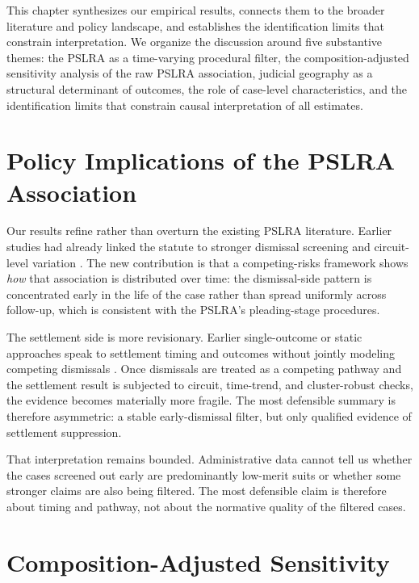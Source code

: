 
This chapter synthesizes our empirical results, connects them
to the broader literature and policy landscape, and
establishes the identification limits that constrain
interpretation. We organize the discussion around five
substantive themes: the
PSLRA as a time-varying procedural filter, the
composition-adjusted sensitivity analysis of the raw PSLRA
association, judicial
geography as a structural determinant of outcomes, the role
of case-level characteristics, and the identification limits
that constrain causal interpretation of all estimates.

\section{Policy Implications of the PSLRA Association}

Our results refine rather than overturn the existing PSLRA
literature. Earlier studies had already linked the statute to
stronger dismissal screening and circuit-level variation
\citep{johnson2001, choi2007}. The new contribution is that a
competing-risks framework shows \emph{how} that association is
distributed over time: the dismissal-side pattern is
concentrated early in the life of the case rather than spread
uniformly across follow-up, which is consistent with the
PSLRA's pleading-stage procedures.

The settlement side is more revisionary. Earlier single-outcome
or static approaches speak to settlement timing and outcomes
without jointly modeling competing dismissals
\citep{brochet2014, cox2008}. Once dismissals are treated as a
competing pathway and the settlement result is subjected to
circuit, time-trend, and cluster-robust checks, the evidence
becomes materially more fragile. The most defensible summary is
therefore asymmetric: a stable early-dismissal filter, but
only qualified evidence of settlement suppression.

That interpretation remains bounded. Administrative data
cannot tell us whether the cases screened out early are
predominantly low-merit suits or whether some stronger claims
are also being filtered. The most defensible claim is
therefore about timing and pathway, not about the normative
quality of the filtered cases.

\section{Composition-Adjusted Sensitivity}

